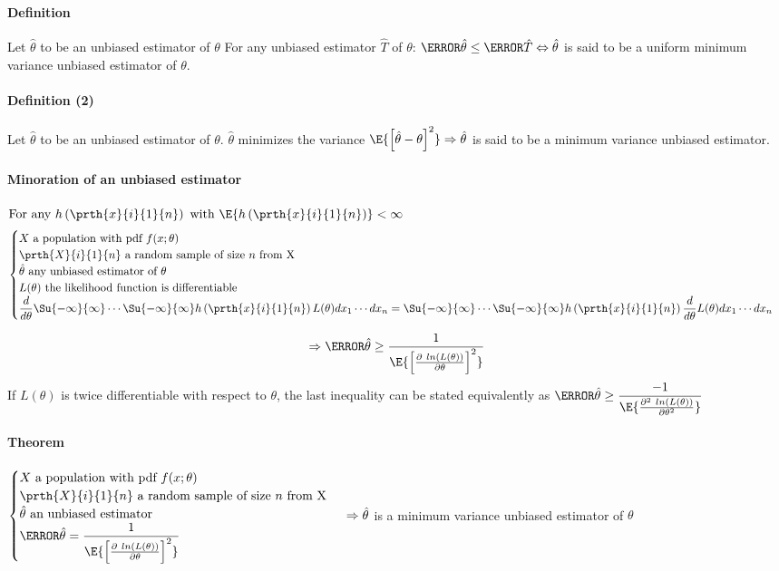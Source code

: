 \paragraph{Definition}
Let $\hat{\theta}$ to be an unbiased estimator of $\theta$
For any unbiased estimator $\hat{T}$ of $\theta$:
$\V{\hat{\theta}} \leq \V{\hat{T}} \Leftrightarrow 
\hat{\theta}$ is said to be a uniform minimum variance unbiased
estimator of $\theta$.

\paragraph{Definition (2)}
Let $\hat{\theta}$ to be an unbiased estimator of $\theta$.
$\hat{\theta}$ minimizes the variance $\E{\left[\hat{\theta}-\theta\right]^{2}} \Rightarrow \hat{\theta}$ is said to be a minimum variance 
unbiased estimator.

\paragraph{Minoration of an unbiased estimator}
$
\text{For any }h\left(\prth{x}{i}{1}{n}\right)\text{ with }
\E{h\left(\prth{x}{i}{1}{n}\right)}<\infty
$
$$
\begin{cases}
	X\text{ a population with pdf }f(x;\theta)\\
	\prth{X}{i}{1}{n}\text{ a random sample of size }n\text{ from
	X}\\
	\hat{\theta}\text{ any unbiased estimator of }\theta\\
	L(\theta)\text{ the likelihood function is differentiable}\\
	\dfrac{d}{d\theta}\Su{-\infty}{\infty}\cdots\Su{-\infty}{\infty}h\left(\prth{x}{i}{1}{n}\right)L(\theta)dx_{1}\cdots dx_{n} = 
	\Su{-\infty}{\infty}\cdots\Su{-\infty}{\infty}h\left(\prth{x}{i}{1}{n}\right)\dfrac{d}{d\theta}L(\theta)dx_{1}\cdots dx_{n}
\end{cases}
$$

$$
\Rightarrow
\V{\hat{\theta}} \geq \dfrac{1}{\E{\left[\frac{\partial~ln\left(L(\theta)\right)}{\partial\theta}\right]^{2}}}
$$
If $L(\theta)$ is twice differentiable with respect to $\theta$, the
last inequality can be stated equivalently as 
$
\V{\hat{\theta}} \geq \dfrac{-1}{\E{\frac{\partial^{2}~ln\left(L(\theta)\right)}{\partial\theta^{2}}}}
$
\paragraph{Theorem}
$
\begin{cases}
	X\text{ a population with pdf }f(x;\theta)\\
	\prth{X}{i}{1}{n}\text{ a random sample of size }n\text{ from
	X}\\
	\hat{\theta}\text{ an unbiased estimator}\\
	\V{\hat{\theta}} = \dfrac{1}{\E{\left[\frac{\partial~ln\left(L(\theta)\right)}{\partial\theta}\right]^{2}}}

\end{cases}\\
\Rightarrow 
\hat{\theta}
$ is a minimum variance unbiased estimator of $\theta$

